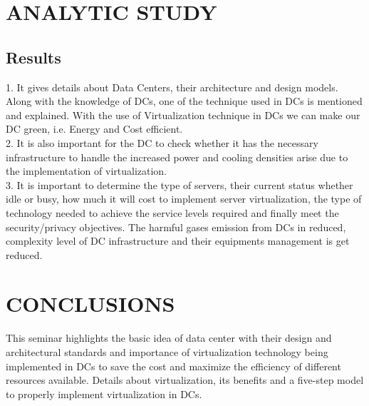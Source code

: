 \documentclass[12pt,a4paper]{report}
\begin{document}
\chapter{ANALYTIC STUDY}

\section{Results}
1. It gives details about Data Centers, their architecture and design models.
Along with the knowledge of DCs, one of the technique used in DCs is mentioned and explained. With the use of Virtualization technique in DCs we can make our DC green, i.e. Energy and Cost efficient. \\
2. It is also important for the DC to check whether it has the necessary infrastructure to handle the increased power and cooling densities arise due to the implementation of virtualization. \\
3. It is important to determine the type of servers, their current status whether idle or busy, how much it will cost to implement server virtualization, the type of technology needed to achieve the service levels required and finally meet the security/privacy objectives. The harmful gases emission from DCs in reduced, complexity level of DC infrastructure and their equipments management is get reduced.








\chapter{CONCLUSIONS }
This seminar highlights the basic idea of data center with their design and architectural standards and  importance of virtualization technology being implemented in DCs to save the cost and maximize the efficiency of different resources available.
Details about virtualization, its benefits and a five-step model to properly implement virtualization in DCs. 









\end{document}
